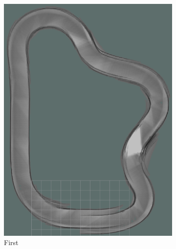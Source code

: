 \begin{figure}[H]
	\centering
	\begin{subfigure}{.3\linewidth}
		\includegraphics[width=\textwidth]{Pictures/1slamtest1}
		\caption{First}
		\end{subfigure}	
	\begin{subfigure}{.3\linewidth}

\end{subfigure}
\end{figure}
